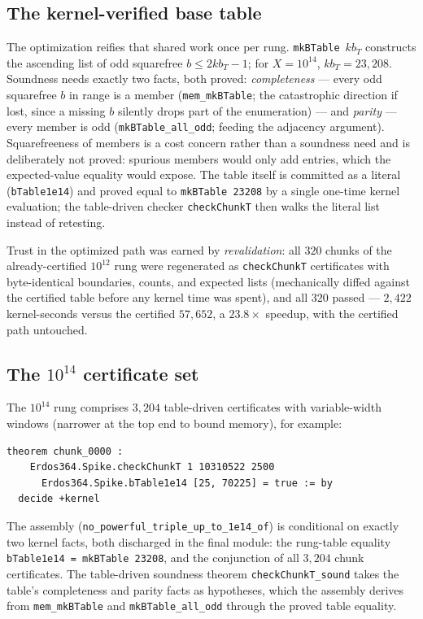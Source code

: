 \documentclass[11pt]{article}
\theoremstyle{definition}
\theoremstyle{remark}
\newcommand{\code}[1]{\texttt{#1}}
\begin{document}
\subsection{The kernel-verified base table}

The optimization reifies that shared work once per rung.
\code{mkBTable}~$kb_T$ constructs the ascending list of odd squarefree
$b \le 2 kb_T - 1$; for $X = 10^{14}$, $kb_T = 23{,}208$. Soundness needs
exactly two facts, both proved: \emph{completeness} --- every odd
squarefree $b$ in range is a member (\code{mem\_mkBTable}; the
catastrophic direction if lost, since a missing $b$ silently drops part
of the enumeration) --- and \emph{parity} --- every member is odd
(\code{mkBTable\_all\_odd}; feeding the adjacency argument).
Squarefreeness of members is a cost concern rather than a soundness need
and is deliberately not proved: spurious members would only add entries,
which the expected-value equality would expose. The table itself is
committed as a literal (\code{bTable1e14}) and proved equal to
\code{mkBTable 23208} by a single one-time kernel evaluation; the
table-driven checker \code{checkChunkT} then walks the literal list
instead of retesting.

Trust in the optimized path was earned by \emph{revalidation}: all $320$
chunks of the already-certified $10^{12}$ rung were regenerated as
\code{checkChunkT} certificates with byte-identical boundaries, counts,
and expected lists (mechanically diffed against the certified table
before any kernel time was spent), and all $320$ passed --- $2{,}422$
kernel-seconds versus the certified $57{,}652$, a $23.8\times$ speedup,
with the certified path untouched.

\subsection{The $10^{14}$ certificate set}

The $10^{14}$ rung comprises $3{,}204$ table-driven certificates with
variable-width windows (narrower at the top end to bound memory), for
example:

\begin{lstlisting}
theorem chunk_0000 :
    Erdos364.Spike.checkChunkT 1 10310522 2500
      Erdos364.Spike.bTable1e14 [25, 70225] = true := by
  decide +kernel
\end{lstlisting}

The assembly (\code{no\_powerful\_triple\_up\_to\_1e14\_of}) is
conditional on exactly two kernel facts, both discharged in the final
module: the rung-table equality \code{bTable1e14 = mkBTable 23208}, and
the conjunction of all $3{,}204$ chunk certificates. The table-driven
soundness theorem \code{checkChunkT\_sound} takes the table's
completeness and parity facts as hypotheses, which the assembly derives
from \code{mem\_mkBTable} and \code{mkBTable\_all\_odd} through the
proved table equality.
\end{document}

